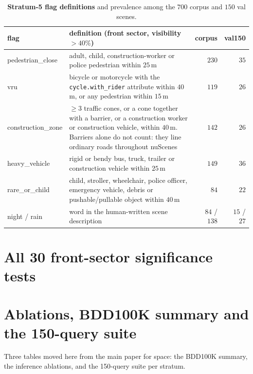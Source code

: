 \documentclass[10pt,letterpaper]{article}
\begin{document}
\begin{table}[H]\centering\small
\caption{\textbf{Stratum-5 flag definitions} and prevalence among the $700$
corpus and $150$ val scenes.}
\label{tab:flags}
\begin{tabular}{p{2.6cm}p{9.0cm}rr}
\toprule
flag & definition (front sector, visibility $>40\%$) & corpus & val150\\
\midrule
pedestrian\_close & adult, child, construction-worker or police pedestrian within $25$\,m & $230$ & $35$\\
vru & bicycle or motorcycle with the \texttt{cycle.with\_rider} attribute within $40$\,m, or any pedestrian within $15$\,m & $119$ & $26$\\
construction\_zone & $\ge3$ traffic cones, or a cone together with a barrier, or a construction worker or construction vehicle, within $40$\,m. Barriers alone do not count: they line ordinary roads throughout nuScenes & $142$ & $26$\\
heavy\_vehicle & rigid or bendy bus, truck, trailer or construction vehicle within $25$\,m & $149$ & $36$\\
rare\_or\_child & child, stroller, wheelchair, police officer, emergency vehicle, debris or pushable/pullable object within $40$\,m & $84$ & $22$\\
night / rain & word in the human-written scene description & $84$ / $138$ & $15$ / $27$\\
\bottomrule
\end{tabular}
\end{table}

\section{All 30 front-sector significance tests}



\section{Ablations, BDD100K summary and the 150-query suite}

Three tables moved here from the main paper for space: the BDD100K summary, the
inference ablations, and the 150-query suite per stratum.
\end{document}

